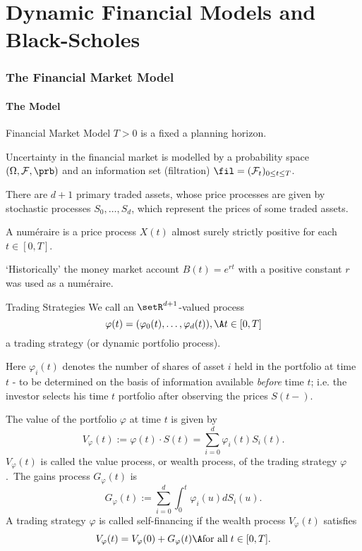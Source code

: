 
\part{Dynamic Financial Models and Black-Scholes}
\section{The Financial Market Model}
\subsection{The Model}

Financial Market Model
	$T>0$ is a fixed a planning horizon.
  
	Uncertainty in the financial market is modelled by a probability
	space $(\Omega, {\cal F},\prb)$ and an information set  (filtration) $\fil =({\cal
	F}_t)_{0\leq t\leq T}$.
		
	There are $d+1$ primary traded assets, whose price processes are
	given by stochastic processes $S_0, \ldots, S_d$, which represent
	the prices of some traded assets.
		
	A num\'{e}raire is a price process $X(t)$ almost surely strictly
	positive for each $t \in [0,T]$.
		
	\lq {Historically}' the money market account $B(t)=e^{rt}$ with a
	positive constant $r$ was used as a
	num\'{e}raire.


Trading Strategies
	We call an $\setR^{d+1}$-valued process
		$$
		\varphi(t) = (\varphi_0(t), \ldots, \varphi_d(t)), \A t \in [0,T]
		$$
	a trading strategy (or dynamic portfolio process).
  
	Here $\varphi_i(t)$ denotes the number of shares of asset $i$ held
	in the portfolio at time $t$ - to be determined on the basis of
	information available {\it before} time $t$; i.e. the investor
	selects his time $t$ portfolio after observing the prices $S(t-)$.

	The value of the portfolio $\varphi$ at time $t$ is given by
		$$
		V_\varphi(t) :=  \varphi(t) \cdot S(t) = \sum_{i=0}^d \varphi_i(t)
		S_i(t).
		$$
	$V_\varphi(t)$ is called the value process, or wealth process, of
	the trading strategy $\varphi$.\  The gains process $G_\varphi(t)$ is
		$$
		G_\varphi(t) := \sum_{i=0}^d \int_0^t \varphi_i(u) dS_i(u).
		$$
	A trading strategy $\varphi$ is called self-financing if the wealth process $V_\varphi(t)$ satisfies
		$$
		V_\varphi(t) = V_\varphi(0) + G_\varphi(t)\A \mbox{for all}\; t\in
		[0,T].
		$$


